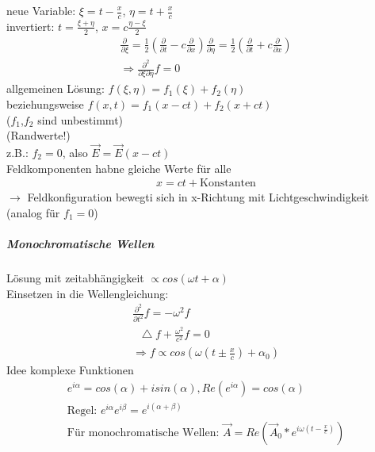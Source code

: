 \documentclass[a4paper]{article}
\newcommand*\laplace{\mathop{}\!\mathbin\bigtriangleup}
\begin{document}
neue Variable: $\xi=t-\frac{x}{c}$, $\eta=t+\frac{x}{c}$\\
invertiert: $t=\frac{\xi+\eta}{2} $, $x=c\frac{\eta-\xi}{2}$
\begin{align}
\frac{\partial}{\partial\xi}=\frac{1}{2}\left(\frac{\partial}{\partial t}-c \frac{\partial}{\partial x} \right)
\frac{\partial}{\partial\eta}=\frac{1}{2}\left(\frac{\partial}{\partial t}+c \frac{\partial}{\partial x} \right)\\
\Rightarrow \frac{\partial^2}{\partial \xi \partial\eta}f=0
\end{align}
allgemeinen Lösung: $f(\xi,\eta)=f_1(\xi)+f_2(\eta)$\\
beziehungsweise $f(x,t)=f_1(x-ct)+f_2(x+ct)$\\
($f_1$,$f_2$ sind unbestimmt)\\
(Randwerte!)\\
z.B.: $f_2=0$, also $\vec{E}=\vec{E}(x-ct)$\\
Feldkomponenten habne gleiche Werte für alle 
\begin{align}
x=ct+\text{Konstanten}
\end{align}
$\rightarrow$ Feldkonfiguration bewegti sich in x-Richtung mit Lichtgeschwindigkeit (analog  für $f_1=0$)

\subparagraph{Monochromatische Wellen}
Lösung mit zeitabhängigkeit $\propto cos(\omega t+\alpha)$\\
Einsetzen in die Wellengleichung:
\begin{align}
\frac{\partial^2}{\partial t^2 }f=-\omega^2f\\
\laplace f+ \frac{\omega^2}{c^2}f=0\\
\Rightarrow f\propto cos(\omega (t\pm\frac{x}{c})+\alpha_0)
\end{align}
Idee komplexe Funktionen
\begin{align}
e^{i\alpha}=cos(\alpha)+isin(\alpha) , Re(e^{i\alpha})=cos(\alpha)\\
\text{Regel: } e^{i\alpha}e^{i\beta}=e^{i(\alpha+\beta)}\\
\text{Für monochromatische Wellen: } \vec{A}=Re(\vec{A}_0 * e^{i
\omega(t-\frac{x}{c})})
\end{align}
\end{document}
